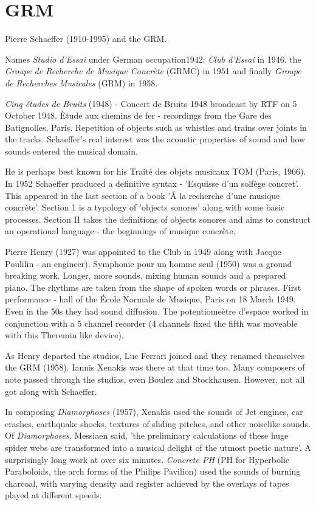 \section{GRM}

Pierre Schaeffer (1910-1995) and the GRM.

Names \textit{Studio d'Essai} under German occupation1942: \textit{Club d'Essai} in 1946. the \textit{Groupe
de Recherche de Musique Concr\`ete} (GRMC) in 1951 and finally \textit{Groupe de Recherches Musicales} (GRM) in 1958.

\textit{Cinq \'etudes de Bruits} (1948) - Concert de Bruits 1948 broadcast by RTF on 5 October 1948. \`Etude aux chemins de fer - recordings from the Gare des Batignolles, Paris. Repetition of objects such as whistles and trains over joints in the tracks. Schaeffer's real interest was the acoustic properties of sound and how sounds entered the musical domain.

He is perhaps best known for his Trait\'e des objets musicaux TOM (Paris, 1966). In 1952 Schaeffer produced a definitive syntax - 'Esquisse d'un solf\`ege concret'. This appeared in the last section of a book 'Á la recherche d'une musique concr\`ete'. Section 1
is a typology of 'objects sonores' along with some basic processes. Section II takes the definitions of objects sonores and aims to construct an operational language - the beginnings of musique concr\`ete.

Pierre Henry (1927) was appointed to the Club in 1949 along with Jacque Poulilin - an engineer). Symphonie pour un homme seul (1950) was a ground breaking work. Longer, more sounds, mixing human sounds and a prepared piano. The rhythms are taken from
the shape of spoken words or phrases. First performance - hall of the \'Ecole Normale de Musique, Paris on 18 March 1949. Even in the 50s they had sound diffusion. The potentiomeètre d'espace worked in conjunction with a 5 channel recorder (4 channels
fixed the fifth was moveable with this Theremin like device).

As Henry departed the studios, Luc Ferrari joined and they renamed themselves the GRM (1958). Iannis Xenakis was there at that time too. Many composers of note passed through the studios, even Boulez and Stockhausen. However, not all got along with
Schaeffer.

In composing \textit{Diamorphoses} (1957), Xenakis used the sounds of Jet engines, car crashes, earthquake shocks, textures of sliding pitches, and other noiselike sounds. Of \textit{Diamorphoses}, Messiaen said, 'the preliminary calculations of these huge spider webs are transformed into a musical delight of the utmost poetic nature'. A surprisingly long work at over six minutes. \textit{Concrete PH} (PH for Hyperbolic Paraboloids, the arch forms of the Philips Pavilion) used the sounds of burning charcoal, with varying density and register achieved by the overlays of tapes played at different speeds.

